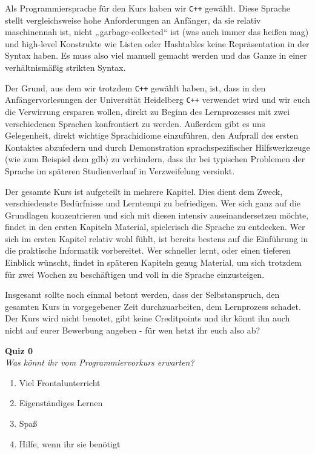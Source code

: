 \documentclass{vorkurs}
\newcommand{\swname}[1]{\texttt{#1}\xspace}
\newcommand{\Cpp}{\swname{C++}}
\begin{document}
Als Programmiersprache für den Kurs haben wir \Cpp gewählt.  Diese Sprache stellt
vergleichsweise hohe Anforderungen an Anfänger, da sie relativ maschinennah
ist, nicht „garbage-collected“ ist (was auch immer das heißen mag) und
high-level Konstrukte wie Listen oder Hashtables keine Repräsentation in der
Syntax haben.  Es muss also viel manuell gemacht werden und das Ganze in einer
verhältnismäßig strikten Syntax.

Der Grund, aus dem wir trotzdem \Cpp gewählt haben, ist, dass in den
Anfängervorlesungen der Universität Heidelberg \Cpp verwendet wird und wir euch
die Verwirrung ersparen wollen, direkt zu Beginn des Lernprozesses mit zwei
verschiedenen Sprachen konfrontiert zu werden.  Außerdem gibt es uns
Gelegenheit, direkt wichtige Sprachidiome einzuführen, den Aufprall des ersten
Kontaktes abzufedern und durch Demonstration sprachspezifischer Hilfswerkzeuge
(wie zum Beispiel dem gdb) zu verhindern, dass ihr bei typischen Problemen der
Sprache im späteren Studienverlauf in Verzweifelung versinkt.

Der gesamte Kurs ist aufgeteilt in mehrere Kapitel. Dies dient dem Zweck,
verschiedenste Bedürfnisse und Lerntempi zu befriedigen.  Wer sich ganz auf die
Grundlagen konzentrieren und sich mit diesen intensiv auseinandersetzen möchte,
findet in den ersten Kapiteln Material, spielerisch die Sprache zu entdecken.
Wer sich im ersten Kapitel relativ wohl fühlt, ist bereits bestens auf die
Einführung in die praktische Informatik vorbereitet.  Wer schneller lernt, oder
einen tieferen Einblick wünscht, findet in späteren Kapiteln genug Material, um
sich trotzdem für zwei Wochen zu beschäftigen und voll in die Sprache
einzusteigen.

Insgesamt sollte noch einmal betont werden, dass der Selbstanspruch, den
gesamten Kurs in vorgegebener Zeit durchzuarbeiten, dem Lernprozess schadet.
Der Kurs wird nicht benotet, gibt keine Creditpoints und ihr könnt ihn auch
nicht auf eurer Bewerbung angeben - für wen hetzt ihr euch also ab?

\newpage

\textbf{Quiz 0}\\
\textit{Was könnt ihr vom Programmiervorkurs erwarten?}
\begin{enumerate}[label=\alph*)]
	\item Viel Frontalunterricht
	\item Eigenständiges Lernen
	\item Spaß
	\item Hilfe, wenn ihr sie benötigt
\end{enumerate}

\tableofcontents




\end{document}
